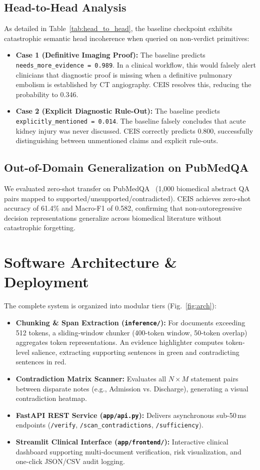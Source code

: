 \documentclass[10pt,conference]{IEEEtran}
\begin{document}
\subsection{Head-to-Head Analysis}
As detailed in Table~\ref{tab:head_to_head}, the baseline checkpoint exhibits catastrophic semantic head incoherence when queried on non-verdict primitives:
\begin{itemize}
    \item \textbf{Case 1 (Definitive Imaging Proof):} The baseline predicts \texttt{needs\_more\_evidence = 0.989}. In a clinical workflow, this would falsely alert clinicians that diagnostic proof is missing when a definitive pulmonary embolism is established by CT angiography. CEIS resolves this, reducing the probability to 0.346.
    \item \textbf{Case 2 (Explicit Diagnostic Rule-Out):} The baseline predicts \texttt{explicitly\_mentioned = 0.014}. The baseline falsely concludes that acute kidney injury was never discussed. CEIS correctly predicts 0.800, successfully distinguishing between unmentioned claims and explicit rule-outs.
\end{itemize}

\subsection{Out-of-Domain Generalization on PubMedQA}
We evaluated zero-shot transfer on PubMedQA~\cite{jin2019pubmedqa} (1,000 biomedical abstract QA pairs mapped to supported/unsupported/contradicted). CEIS achieves zero-shot accuracy of 61.4\% and Macro-F1 of 0.582, confirming that non-autoregressive decision representations generalize across biomedical literature without catastrophic forgetting.

\section{Software Architecture \& Deployment}
The complete system is organized into modular tiers (Fig.~\ref{fig:arch}):
\begin{itemize}
    \item \textbf{Chunking \& Span Extraction (\texttt{inference/}):} For documents exceeding 512 tokens, a sliding-window chunker (400-token window, 50-token overlap) aggregates token representations. An evidence highlighter computes token-level salience, extracting supporting sentences in green and contradicting sentences in red.
    \item \textbf{Contradiction Matrix Scanner:} Evaluates all $N \times M$ statement pairs between disparate notes (e.g., Admission vs. Discharge), generating a visual contradiction heatmap.
    \item \textbf{FastAPI REST Service (\texttt{app/api.py}):} Delivers asynchronous sub-50\,ms endpoints (\texttt{/verify}, \texttt{/scan\_contradictions}, \texttt{/sufficiency}).
    \item \textbf{Streamlit Clinical Interface (\texttt{app/frontend/}):} Interactive clinical dashboard supporting multi-document verification, risk visualization, and one-click JSON/CSV audit logging.
\end{itemize}
\end{document}
